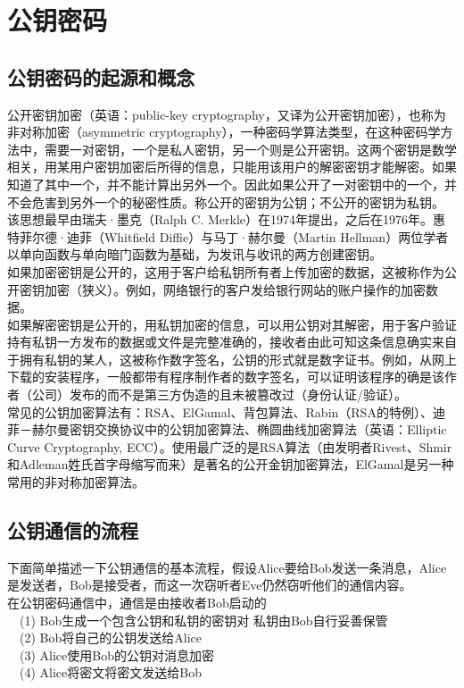 \documentclass[UTF8,nofonts,cs4size]{ctexrep}
\begin{document}
\chapter{公钥密码}
\section{公钥密码的起源和概念}
公开密钥加密（英语：public-key cryptography，又译为公开密钥加密），也称为非对称加密（asymmetric cryptography），一种密码学算法类型，在这种密码学方法中，需要一对密钥，一个是私人密钥，另一个则是公开密钥。这两个密钥是数学相关，用某用户密钥加密后所得的信息，只能用该用户的解密密钥才能解密。如果知道了其中一个，并不能计算出另外一个。因此如果公开了一对密钥中的一个，并不会危害到另外一个的秘密性质。称公开的密钥为公钥；不公开的密钥为私钥。\\
\indent 该思想最早由瑞夫·墨克（Ralph C. Merkle）在1974年提出，之后在1976年。惠特菲尔德·迪菲（Whitfield Diffie）与马丁·赫尔曼（Martin Hellman）两位学者以单向函数与单向暗门函数为基础，为发讯与收讯的两方创建密钥。\\
\indent 如果加密密钥是公开的，这用于客户给私钥所有者上传加密的数据，这被称作为公开密钥加密（狭义）。例如，网络银行的客户发给银行网站的账户操作的加密数据。\\
\indent 如果解密密钥是公开的，用私钥加密的信息，可以用公钥对其解密，用于客户验证持有私钥一方发布的数据或文件是完整准确的，接收者由此可知这条信息确实来自于拥有私钥的某人，这被称作数字签名，公钥的形式就是数字证书。例如，从网上下载的安装程序，一般都带有程序制作者的数字签名，可以证明该程序的确是该作者（公司）发布的而不是第三方伪造的且未被篡改过（身份认证/验证）。\\
\indent 常见的公钥加密算法有：RSA、ElGamal、背包算法、Rabin（RSA的特例）、迪菲－赫尔曼密钥交换协议中的公钥加密算法、椭圆曲线加密算法（英语：Elliptic Curve Cryptography, ECC）。使用最广泛的是RSA算法（由发明者Rivest、Shmir和Adleman姓氏首字母缩写而来）是著名的公开金钥加密算法，ElGamal是另一种常用的非对称加密算法。
\section{公钥通信的流程}
下面简单描述一下公钥通信的基本流程，假设Alice要给Bob发送一条消息，Alice是发送者，Bob是接受者，而这一次窃听者Eve仍然窃听他们的通信内容。\\
\indent 在公钥密码通信中，通信是由接收者Bob启动的
\\ \indent\ \ (1) Bob生成一个包含公钥和私钥的密钥对 私钥由Bob自行妥善保管
\\ \indent\ \ (2) Bob将自己的公钥发送给Alice
\\ \indent\ \ (3) Alice使用Bob的公钥对消息加密
\\ \indent\ \ (4) Alice将密文将密文发送给Bob
\\
\end{document}
